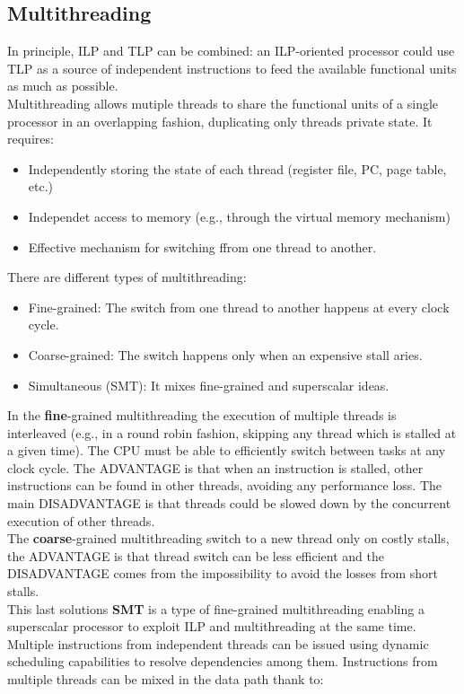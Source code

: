 \documentclass[12pt]{article}
\begin{document}
\subsection{Multithreading}
In principle, ILP and TLP can be combined: an ILP-oriented processor could use TLP as a source of independent instructions to feed the available functional units as much as possible.\\
Multithreading allows mutiple threads to share the functional units of a single processor in an overlapping fashion, duplicating only threads private state. It requires:
\begin{itemize}
  \item Independently storing the state of each thread (register file, PC, page table, etc.)
  \item Independet access to memory (e.g., through the virtual memory mechanism)
  \item Effective mechanism for switching ffrom one thread to another.
\end{itemize}
There are different types of multithreading:
\begin{itemize}
  \item Fine-grained: The switch from one thread to another happens at every clock cycle.
  \item Coarse-grained: The switch happens only when an expensive stall aries.
  \item Simultaneous (SMT): It mixes fine-grained and superscalar ideas.
\end{itemize}
In the \textbf{fine}-grained multithreading the execution of multiple threads is interleaved (e.g., in a round robin fashion, skipping any thread which is stalled at a given time). The CPU must be able to efficiently switch between tasks at any clock cycle. The ADVANTAGE is that when an instruction is stalled, other instructions can be found in other threads, avoiding any performance loss. The main DISADVANTAGE is that threads could be slowed down by the concurrent execution of other threads.\\
The \textbf{coarse}-grained multithreading switch to a new thread only on costly stalls, the ADVANTAGE is that thread switch can be less efficient and the DISADVANTAGE comes from the impossibility to avoid the losses from short stalls.\\
This last solutions \textbf{SMT} is a type of fine-grained multithreading enabling a superscalar processor to exploit ILP and multithreading at the same time. Multiple instructions from independent threads can be issued using dynamic scheduling capabilities to resolve dependencies among them. Instructions from multiple threads can be mixed in the data path thank to:
\end{document}
